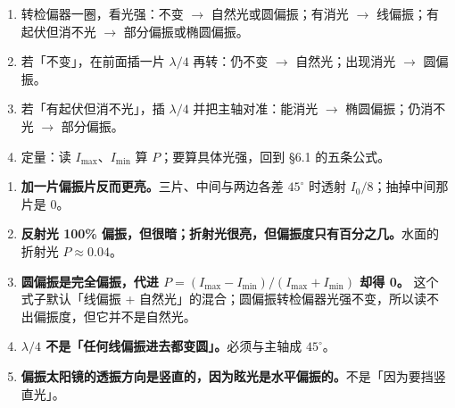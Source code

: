 \documentclass[11pt]{ctexart}
\let\subhdrtheme\subhdr
\renewcommand{\subhdr}[1]{\needspace{4\baselineskip}\subhdrtheme{#1}}
\let\hdrorig\hdr
\renewcommand{\hdr}[2]{\needspace{8\baselineskip}\hdrorig{#1}{#2}}
\begin{document}

\begin{enumerate}
\item 转检偏器一圈，看光强：不变 $\to$ 自然光或圆偏振；有消光 $\to$ 线偏振；有起伏但消不光 $\to$ 部分偏振或椭圆偏振。
\item 若「不变」，在前面插一片 $\lambda/4$ 再转：仍不变 $\to$ 自然光；出现消光 $\to$ 圆偏振。
\item 若「有起伏但消不光」，插 $\lambda/4$ 并把主轴对准：能消光 $\to$ 椭圆偏振；仍消不光 $\to$ 部分偏振。
\item 定量：读 $I_{\max}$、$I_{\min}$ 算 $P$；要算具体光强，回到 §6.1 的五条公式。
\end{enumerate}


\begin{enumerate}
\item \textbf{加一片偏振片反而更亮。}三片、中间与两边各差 $45^\circ$ 时透射 $I_0/8$；抽掉中间那片是 $0$。
\item \textbf{反射光 100\% 偏振，但很暗；折射光很亮，但偏振度只有百分之几。}水面的折射光 $P\approx0.04$。
\item \textbf{圆偏振是完全偏振，代进 $P=(I_{\max}-I_{\min})/(I_{\max}+I_{\min})$ 却得 0。}
这个式子默认「线偏振 + 自然光」的混合；圆偏振转检偏器光强不变，所以读不出偏振度，但它并不是自然光。
\item \textbf{$\lambda/4$ 不是「任何线偏振进去都变圆」。}必须与主轴成 $45^\circ$。
\item \textbf{偏振太阳镜的透振方向是竖直的，因为眩光是水平偏振的。}不是「因为要挡竖直光」。
\end{enumerate}



\end{document}
